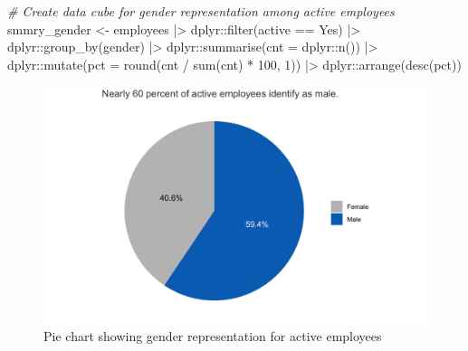 \documentclass[
]{book}
\newenvironment{Shaded}{\begin{snugshade}}{\end{snugshade}}
\newcommand{\AttributeTok}[1]{\textcolor[rgb]{0.77,0.63,0.00}{#1}}
\newcommand{\CommentTok}[1]{\textcolor[rgb]{0.56,0.35,0.01}{\textit{#1}}}
\newcommand{\DecValTok}[1]{\textcolor[rgb]{0.00,0.00,0.81}{#1}}
\newcommand{\FunctionTok}[1]{\textcolor[rgb]{0.00,0.00,0.00}{#1}}
\newcommand{\NormalTok}[1]{#1}
\newcommand{\OtherTok}[1]{\textcolor[rgb]{0.56,0.35,0.01}{#1}}
\newcommand{\SpecialCharTok}[1]{\textcolor[rgb]{0.00,0.00,0.00}{#1}}
\newcommand{\StringTok}[1]{\textcolor[rgb]{0.31,0.60,0.02}{#1}}
\begin{document}
\begin{Shaded}
\begin{Highlighting}[]
\CommentTok{\# Create data cube for gender representation among active employees}
\NormalTok{smmry\_gender }\OtherTok{\textless{}{-}}\NormalTok{ employees }\SpecialCharTok{|\textgreater{}}
\NormalTok{                dplyr}\SpecialCharTok{::}\FunctionTok{filter}\NormalTok{(active }\SpecialCharTok{==} \StringTok{\textquotesingle{}Yes\textquotesingle{}}\NormalTok{) }\SpecialCharTok{|\textgreater{}}
\NormalTok{                dplyr}\SpecialCharTok{::}\FunctionTok{group\_by}\NormalTok{(gender) }\SpecialCharTok{|\textgreater{}}
\NormalTok{                dplyr}\SpecialCharTok{::}\FunctionTok{summarise}\NormalTok{(}\AttributeTok{cnt =}\NormalTok{ dplyr}\SpecialCharTok{::}\FunctionTok{n}\NormalTok{()) }\SpecialCharTok{|\textgreater{}}
\NormalTok{                dplyr}\SpecialCharTok{::}\FunctionTok{mutate}\NormalTok{(}\AttributeTok{pct =} \FunctionTok{round}\NormalTok{(cnt }\SpecialCharTok{/} \FunctionTok{sum}\NormalTok{(cnt) }\SpecialCharTok{*} \DecValTok{100}\NormalTok{, }\DecValTok{1}\NormalTok{)) }\SpecialCharTok{|\textgreater{}}
\NormalTok{                dplyr}\SpecialCharTok{::}\FunctionTok{arrange}\NormalTok{(}\FunctionTok{desc}\NormalTok{(pct))}
\end{Highlighting}
\end{Shaded}

\begin{figure}

{\centering \includegraphics[width=1\linewidth]{graphics/pie_chart} 

}

\caption{Pie chart showing gender representation for active employees}\label{fig:pie-chart}
\end{figure}
\end{document}
